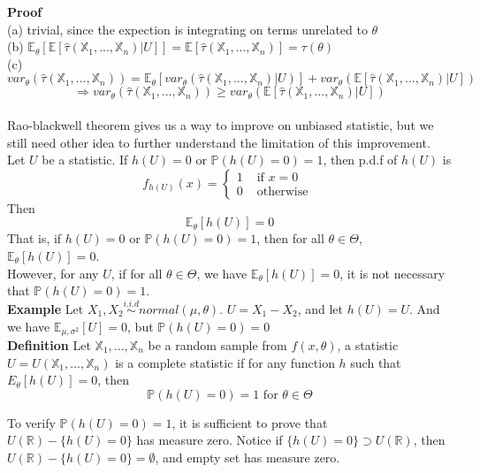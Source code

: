 \textbf{Proof}\\
(a) trivial, since the expection is integrating on terms unrelated to $\theta$\\
(b) $\mathbb{E}_\theta[ \mathbb{E}[ \hat{\tau}(\mathbb{X}_1, ..., \mathbb{X}_n) | U ] ] = \mathbb{E}[ \hat{\tau}(\mathbb{X}_1, ..., \mathbb{X}_n) ] = \tau(\theta)$\\
(c) $var_\theta( \hat{\tau}(\mathbb{X}_1, ..., \mathbb{X}_n) ) = \mathbb{E}_\theta[ var_\theta( \hat{\tau}(\mathbb{X}_1, ..., \mathbb{X}_n) | U) ] + var_\theta( \mathbb{E} [ \hat{\tau}(\mathbb{X}_1, ..., \mathbb{X}_n) | U ] )$
$$\Rightarrow var_\theta( \hat{\tau}(\mathbb{X}_1, ..., \mathbb{X}_n) ) \geq var_\theta( \mathbb{E} [ \hat{\tau}(\mathbb{X}_1, ..., \mathbb{X}_n) | U ] )$$\\

Rao-blackwell theorem gives us a way to improve on unbiased statistic, but we still need other idea to further understand the limitation of this improvement.\\

Let $U$ be a statistic. If $h(U) = 0$ or $\mathbb{P}(h(U)=0)=1$, then p.d.f of $h(U)$ is
$$f_{h(U)}(x) = 
\begin{cases}
1 & \text{ if } x=0\\
0 & \text{ otherwise }
\end{cases}$$
Then
$$\mathbb{E}_\theta[ h(U) ] = 0$$
That is, if $h(U) = 0$ or $\mathbb{P}(h(U)=0)=1$, then for all $\theta\in\Theta$, $\mathbb{E}_\theta[ h(U) ] = 0$.\\

However, for any $U$, if for all $\theta\in\Theta$, we have $\mathbb{E}_\theta[h(U)] = 0$, it is not necessary that $\mathbb{P}(h(U)=0)=1$.\\

\textbf{Example} Let $X_1, X_2 \overset{i.i.d}{\sim} normal(\mu, \theta)$. $U = X_1 - X_2$, and let $h(U) = U$. And we have $\mathbb{E}_{\mu, \sigma^2}[U] = 0$, but $\mathbb{P}(h(U)=0)=0$\\

\textbf{Definition} Let $\mathbb{X}_1, ..., \mathbb{X}_n$ be a random sample from $f(x, \theta)$, a statistic $U = U(\mathbb{X}_1, ..., \mathbb{X}_n)$ is a complete statistic if for any function $h$ such that $E_\theta[h(U)] = 0$, then
$$\mathbb{P}(h(U)=0)=1 \text{ for } \theta\in\Theta$$

To verify $\mathbb{P}( h(U) = 0 ) = 1$, it is sufficient to prove that $U(\mathbb{R}) - \{h(U) = 0\}$ has measure zero. Notice if $\{h(U) = 0\} \supset U(\mathbb{R})$, then $U(\mathbb{R}) - \{h(U) = 0\} = \emptyset$, and empty set has measure zero.\\


